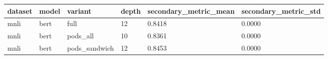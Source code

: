 \begin{tabular}{llllll}
\hline
dataset & model & variant & depth & secondary\_metric\_mean & secondary\_metric\_std \\
\hline
mnli & bert & full & 12 & 0.8418 & 0.0000 \\
mnli & bert & pods\_all & 10 & 0.8361 & 0.0000 \\
mnli & bert & pods\_sandwich & 12 & 0.8453 & 0.0000 \\
\hline
\end{tabular}
